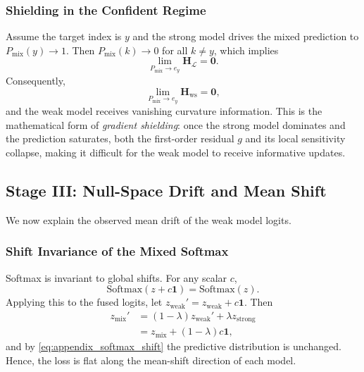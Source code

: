 \subsubsection{Shielding in the Confident Regime}
Assume the target index is $y$ and the strong model drives the mixed prediction to $P_{\mathrm{mix}}(y) \to 1$. Then $P_{\mathrm{mix}}(k) \to 0$ for all $k \neq y$, which implies
\begin{equation}
    \lim_{P_{\mathrm{mix}} \to e_y}\mathbf{H}_{\mathcal{L}} = \mathbf{0}.
    \label{eq:appendix_hessian_collapse}
\end{equation}
Consequently,
\begin{equation}
    \lim_{P_{\mathrm{mix}} \to e_y} \mathbf{H}_{\mathrm{ws}} = \mathbf{0},
    \label{eq:appendix_cross_hessian_collapse}
\end{equation}
and the weak model receives vanishing curvature information. This is the mathematical form of \emph{gradient shielding}: once the strong model dominates and the prediction saturates, both the first-order residual $g$ and its local sensitivity collapse, making it difficult for the weak model to receive informative updates.

\subsection{Stage III: Null-Space Drift and Mean Shift}
We now explain the observed mean drift of the weak model logits.

\subsubsection{Shift Invariance of the Mixed Softmax}
Softmax is invariant to global shifts. For any scalar $c$,
\begin{equation}
    \text{Softmax}(z + c\mathbf{1}) = \text{Softmax}(z).
    \label{eq:appendix_softmax_shift}
\end{equation}
Applying this to the fused logits, let $z_{\mathrm{weak}}' = z_{\mathrm{weak}} + c\mathbf{1}$. Then
\begin{align}
    z_{\text{mix}}'
    &= (1-\lambda) z_{\mathrm{weak}}' + \lambda z_{\mathrm{strong}} \nonumber\\
    &= z_{\text{mix}} + (1-\lambda) c \mathbf{1},
    \label{eq:appendix_shift_mix}
\end{align}
and by \eqref{eq:appendix_softmax_shift} the predictive distribution is unchanged. Hence, the loss is flat along the mean-shift direction of each model.

